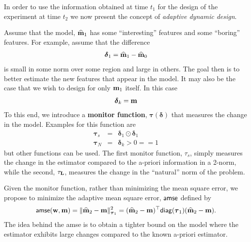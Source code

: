 \documentclass[english]{siamltex}
\newcommand{\bfL}	{{\bf{L}}}
\newcommand{\bfm}	{{\bf{m}}}
\newcommand{\bfw}	{{\bf{w}}}
\newcommand{\bftau}      {{\boldsymbol \tau}}
\newcommand{\bfdelta}	 { { \boldsymbol \delta} }
\newcommand{\bfmhat}    {{\widehat{\bfm}}}
\renewcommand{\bfmhat}	{\widehat{\bf m}}
\begin{document}
{In order to use the information obtained at time $t_{1}$ for the design of the experiment at time $t_{2}$
 we now present the concept of {\em adaptive dynamic
design}.

 Assume that the model, $\bfmhat_{1}$ has some ``interesting'' features and some ``boring'' features.
For example, assume that the difference
\begin{eqnarray}
\label{diff}
 \bfdelta_{1} = \bfmhat_{1} - \bfmhat_{0}
\end{eqnarray}
is small in some norm over some region and large in others. The goal then is to better estimate the new features
that appear in the model. It may also be the case that we wish to design for only $\bfm_1$ itself. In this case
\begin{equation}
\label{diff}
 \bfdelta_k = \bfm
\end{equation} To this end, we introduce a {\bf monitor function}, $\bftau(\bfdelta)$ that measures
the change in the model. 
Examples for this function are
\begin{subequations}
\label{taufuns}
\begin{eqnarray}
\bftau_{s} &=& \bfdelta_1 \odot \bfdelta_1 \\
\bftau_{N} &=&  \bfdelta_k  > 0 == 1
\end{eqnarray}
\end{subequations}
but other functions can be used. The first monitor  function, $\tau_{s}$, simply measures the change in the estimator
compared to the a-priori information in a 2-norm, while the second, $\tau_{\bfL}$, measures the change in the 
``natural'' norm of the problem.

Given the monitor function,
rather than minimizing the mean square error, we propose to minimize the
adaptive mean square error, ${\sf amse}$ defined by
\begin{eqnarray}
\label{amse}
{\sf amse}(\bfw,\bfm) = \| \bfmhat_2 -\bfm \|_{\bftau_1}^{2} = 
 (\bfmhat_2 -\bfm)^{\top}{\sf diag}(\bftau_1)(\bfmhat_2 -\bfm).
 \end{eqnarray}
The idea behind the {\sf amse} is to obtain a tighter bound on the model where the estimator exhibits large changes
compared to the known a-priori estimator. 

}
\end{document}
